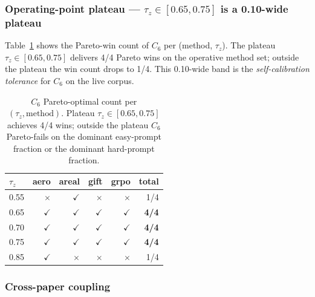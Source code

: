 \documentclass{article}
\begin{document}
\subsubsection*{Operating-point plateau --- $\tau_z \in [0.65, 0.75]$ is a 0.10-wide plateau}

Table~\ref{tab:p7-iter175-c6-sweep} shows the Pareto-win count of
$C_6$ per (method, $\tau_z$). The plateau
$\tau_z \in [0.65, 0.75]$ delivers 4/4 Pareto wins on the operative
method set; outside the plateau the win count drops to 1/4.
This 0.10-wide band is the \emph{self-calibration tolerance} for $C_6$
on the live corpus.

\begin{table}[ht]
\centering
\small
\begin{tabular}{lrrrrr}
\toprule
$\tau_z$ & aero & areal & gift & grpo & total \\
\midrule
0.55 & $\times$ & $\checkmark$ & $\times$ & $\times$ & 1/4 \\
0.65 & $\checkmark$ & $\checkmark$ & $\checkmark$ & $\checkmark$ & \textbf{4/4} \\
0.70 & $\checkmark$ & $\checkmark$ & $\checkmark$ & $\checkmark$ & \textbf{4/4} \\
0.75 & $\checkmark$ & $\checkmark$ & $\checkmark$ & $\checkmark$ & \textbf{4/4} \\
0.85 & $\checkmark$ & $\times$ & $\times$ & $\times$ & 1/4 \\
\bottomrule
\end{tabular}
\caption{$C_6$ Pareto-optimal count per $(\tau_z, \mathrm{method})$.
Plateau $\tau_z \in [0.65, 0.75]$ achieves 4/4 wins; outside the plateau
$C_6$ Pareto-fails on the dominant easy-prompt fraction or the dominant
hard-prompt fraction.}
\label{tab:p7-iter175-c6-sweep}
\end{table}

\subsubsection*{Cross-paper coupling}
\end{document}
